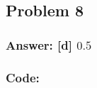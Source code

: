 \documentclass[11pt]{article}
\begin{document}
    \begin{center}
    \end{center}
    { \hspace*{\fill} \\}
    
    \hypertarget{problem-8}{%
\subsection{Problem 8}\label{problem-8}}

\hypertarget{answer-d-0.5}{%
\subsubsection{\texorpdfstring{Answer: {[}d{]}
\(0.5\)}{Answer: {[}d{]} 0.5}}\label{answer-d-0.5}}

\hypertarget{code}{%
\subsubsection{Code:}\label{code}}
\end{document}
